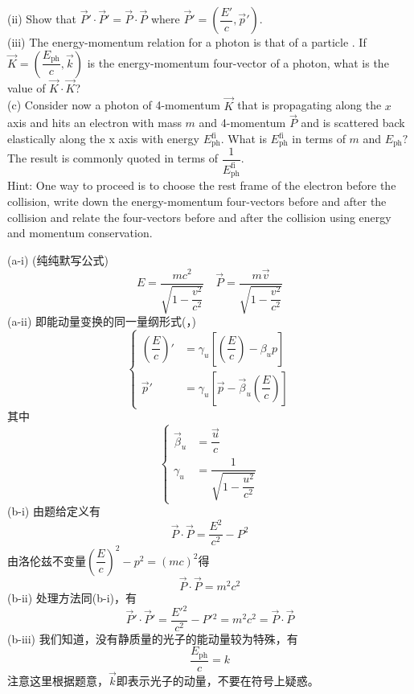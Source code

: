 \begin{solution}
    \hspace*{2em}(ii) Show that $\vec{P}'\cdot\vec{P}'=\vec{P}\cdot\vec{P}$ where $\vec{P}'=(\dfrac{E'}{c},\vec{p}')$.\\
    \hspace*{2em}(iii) The energy-momentum relation for a photon is that of a particle . If $\vec{K} = ( \dfrac{E_{\mathrm{ph}}}{c}, \vec{k} )$ is the energy-momentum four-vector of a photon, what is the value of $\vec{K}\cdot\vec{K}$?\\
    (c) Consider now a photon of 4-momentum $\vec{K}$ that is propagating along the $x$ axis and hits an electron with mass $m$ and 4-momentum $\vec{P}$ and is scattered back elastically along the x axis with energy $E_{\mathrm{ph}}^{\mathrm{fi}}.$ What is $E_\mathrm{ph}^\mathrm{fi}$ in terms of $m$ and $E_\mathrm{ph}?$ The result is commonly quoted in terms of $\dfrac{1}{E_\mathrm{ph}^\mathrm{fi}}$.\\
    Hint: One way to proceed is to choose the rest frame of the electron before the collision, write down the energy-momentum four-vectors before and after the collision and relate the four-vectors before and after the collision using energy and momentum conservation.

    \tcbrule

    (a-i) (纯纯默写公式)
    \[E=\frac{mc^{2}}{\sqrt{1-\dfrac{v^2}{c^{2}}}}\quad\vec{P}=\frac{m\vec{v}}{\sqrt{1-\dfrac{v^2}{c^{2}}}}\]
    (a-ii) 即能动量变换的同一量纲形式(，)
    \[\left\{\begin{aligned}
            \left(\dfrac{E}{c}\right)' & =\gamma_u\left[\left(\dfrac{E}{c}\right)-\beta_u p\right]            \\
            \vec{p}'                   & =\gamma_u\left[\vec{p}-\vec{\beta}_u\left(\dfrac{E}{c}\right)\right]
        \end{aligned}\right.\]
    其中
    \[\left\{\begin{aligned}
            \vec{\beta}_u & =\dfrac{\vec{u}}{c}                   \\
            \gamma_u      & =\dfrac{1}{\sqrt{1-\dfrac{u^2}{c^2}}}
        \end{aligned}\right.\]
    (b-i) 由题给定义有
    \[\vec{P}\cdot \vec{P}= \frac {E^{2}}{c^{2}}- P^{2}\]
    由洛伦兹不变量$\left(\dfrac{E}{c}\right)^2-p^2=(mc)^2$得
    \[\vec{P}\cdot\vec{P}=m^2c^2\]
    (b-ii) 处理方法同(b-i)，有
    \[\vec{P}'\cdot \vec{P}'= \frac {E'{}^{2}}{c^{2}}- P'{}^{2}=m^2c^2=\vec{P}\cdot\vec{P}\]
    (b-iii) 我们知道，没有静质量的光子的能动量较为特殊，有
    \[\dfrac{E_{\mathrm{ph}}}{c}=k\]
    注意这里根据题意，$\vec{k}$即表示光子的动量，不要在符号上疑惑。


\end{solution}
